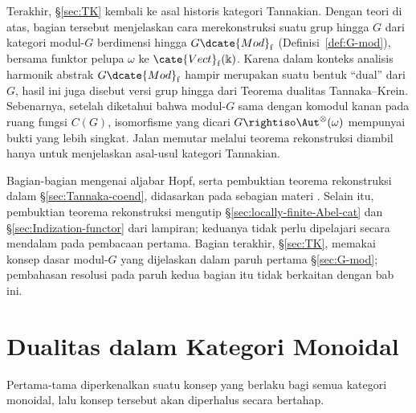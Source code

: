 Terakhir, \S\ref{sec:TK} kembali ke asal historis kategori Tannakian. Dengan
teori di atas, bagian tersebut menjelaskan cara merekonstruksi suatu grup
hingga $G$ dari kategori modul-$G$ berdimensi hingga
$G\dcate{Mod}_{\mathrm{f}}$ (Definisi~\ref{def:G-mod}), bersama funktor pelupa
$\omega$ ke $\cate{Vect}_{\mathrm{f}}(\Bbbk)$. Karena dalam konteks analisis
harmonik abstrak $G\dcate{Mod}_{\mathrm{f}}$ hampir merupakan suatu bentuk
``dual'' dari $G$, hasil ini juga disebut versi grup hingga dari Teorema
dualitas Tannaka--Krein. Sebenarnya, setelah diketahui bahwa modul-$G$ sama
dengan komodul kanan pada ruang fungsi $C(G)$, isomorfisme yang dicari
$G\rightiso\Aut^\otimes(\omega)$ mempunyai bukti yang lebih singkat. Jalan
memutar melalui teorema rekonstruksi diambil hanya untuk menjelaskan asal-usul
kategori Tannakian.

\begin{wenxintishi}
	Bagian-bagian mengenai aljabar Hopf, serta pembuktian teorema rekonstruksi
	dalam \S\ref{sec:Tannaka-coend}, didasarkan pada sebagian materi
	. Selain itu, pembuktian teorema rekonstruksi mengutip
	\S\ref{sec:locally-finite-Abel-cat} dan
	\S\ref{sec:Indization-functor} dari lampiran; keduanya tidak perlu
	dipelajari secara mendalam pada pembacaan pertama. Bagian terakhir,
	\S\ref{sec:TK}, memakai konsep dasar modul-$G$ yang dijelaskan dalam paruh
	pertama \S\ref{sec:G-mod}; pembahasan resolusi pada paruh kedua bagian itu
	tidak berkaitan dengan bab ini.
\end{wenxintishi}

\section{Dualitas dalam Kategori Monoidal}\label{sec:monoidal-dual}

Pertama-tama diperkenalkan suatu konsep yang berlaku bagi semua kategori
monoidal, lalu konsep tersebut akan diperhalus secara bertahap.

